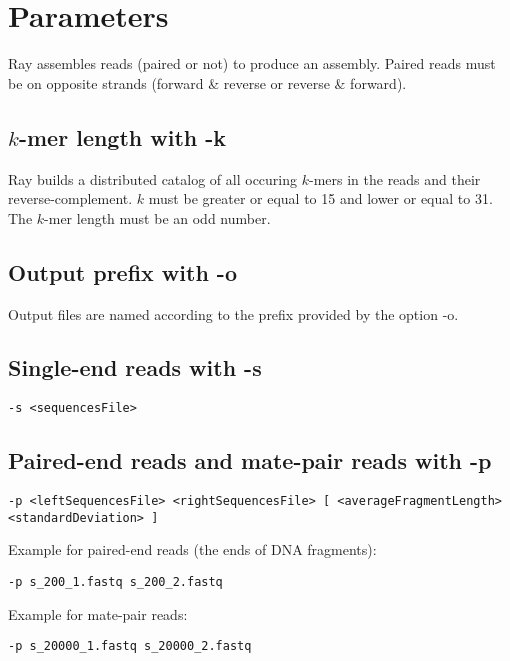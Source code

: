 \documentclass{article}
\begin{document}
\section{Parameters}

Ray assembles reads (paired or not) to produce an assembly.
Paired reads must be on opposite strands (forward \& reverse or reverse \& forward).



\subsection{$k$-mer length with -k}

Ray builds a distributed catalog of all occuring $k$-mers in the reads and their reverse-complement. $k$ must be greater or equal to 15 and lower or equal to 31. The $k$-mer length must be an odd number.

\subsection{Output prefix with -o}

Output files are named according to the prefix provided by the option -o.

\subsection{Single-end reads with -s}

\begin{verbatim}
-s <sequencesFile>
\end{verbatim}

\subsection{Paired-end reads and mate-pair reads with -p}

\begin{verbatim}
-p <leftSequencesFile> <rightSequencesFile> [ <averageFragmentLength> <standardDeviation> ]
\end{verbatim}

Example for paired-end reads (the ends of DNA fragments):

\begin{verbatim}
-p s_200_1.fastq s_200_2.fastq
\end{verbatim}

Example for mate-pair reads:

\begin{verbatim}
-p s_20000_1.fastq s_20000_2.fastq
\end{verbatim}
\end{document}

